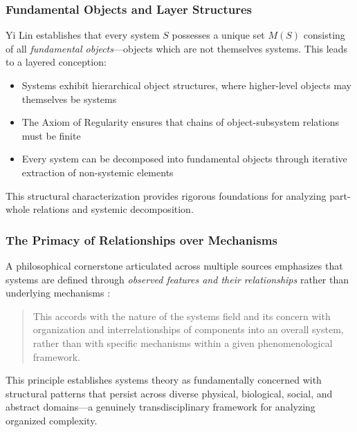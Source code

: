 \subsubsection{Fundamental Objects and Layer Structures}

Yi Lin \citep{lin1999general} establishes that every system $S$ possesses a unique set $M(S)$ consisting of all \emph{fundamental objects}---objects which are not themselves systems. This leads to a layered conception:

\begin{itemize}
\item Systems exhibit hierarchical object structures, where higher-level objects may themselves be systems
\item The Axiom of Regularity ensures that chains of object-subsystem relations must be finite
\item Every system can be decomposed into fundamental objects through iterative extraction of non-systemic elements
\end{itemize}

This structural characterization provides rigorous foundations for analyzing part-whole relations and systemic decomposition.

\subsubsection{The Primacy of Relationships over Mechanisms}

A philosophical cornerstone articulated across multiple sources emphasizes that systems are defined through \emph{observed features and their relationships} rather than underlying mechanisms \citep{mesarovic1975mathematical}:

\begin{quote}
This accords with the nature of the systems field and its concern with organization and interrelationships of components into an overall system, rather than with specific mechanisms within a given phenomenological framework.
\end{quote}

This principle establishes systems theory as fundamentally concerned with structural patterns that persist across diverse physical, biological, social, and abstract domains---a genuinely transdisciplinary framework for analyzing organized complexity.